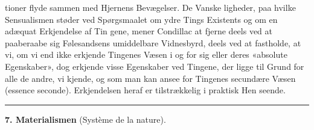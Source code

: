 \documentclass[12pt,a4paper]{book}
\newcommand{\divrule}{\begin{center}\rule{2cm}{0.4pt}\end{center}}
\begin{document}
tioner flyde sammen med Hjernens Bevægelser. De Vanske\-%
ligheder, paa hvilke Sensualismen støder ved Spørgsmaalet om
ydre Tings Existents og om en adæquat Erkjendelse af Tin\-%
gene, mener Condillac at fjerne deels ved at paaberaabe sig
Følesandsens umiddelbare Vidnesbyrd, deels ved at fastholde,
at vi, om vi end ikke erkjende Tingenes Væsen i og for sig eller
deres «absolute Egenskaber», dog erkjende visse Egenskaber ved
Tingene, der ligge til Grund for alle de andre, vi kjende, og
som man kan ansee for Tingenes secundære Væsen (essence
seconde). Erkjendelsen heraf er tilstrækkelig i praktisk Hen\-%
seende.

\divrule
%

\begin{center}
  \textbf{7. Materialismen} (Système de la nature).
\end{center}
\end{document}
